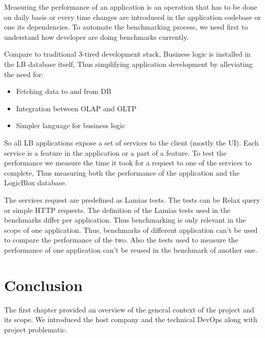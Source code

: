 Measuring the performance of an application is an operation that has to be done on
daily basis or every time changes are introduced in the application codebase or
one its dependencies.
To automate the benchmarking process, we need first to understand how developer
are doing benchmarks currently.

Compare to traditional 3-tired development stack, Business logic is installed in
the LB database itself, Thus simplifying  application development by alleviating
the need for:
\begin{itemize}
\item{Fetching data to and from DB }
\item{Integration between OLAP and OLTP}
\item{Simpler language for business logic}
\end{itemize}

So all LB applications expose a set of services to the client (mostly the UI).
Each service is a feature in the application or a part of a feature. To test the
performance we measure the time it took for a request to one of the services to
complete, Thus measuring both the performance of the application and the
LogicBlox database.

The services request are predefined as Lamias tests. The tests can be Relax
query or simple HTTP requests. The definition of the Lamias tests used in the
benchmarks differ per application. Thus benchmarking is only relevant in the
scope of one application. Thus, benchmarks of different application can't be
used to compare the performance of the two. Also the tests used to measure the
performance of one application can't be reused in the benchmark of another one.

\section*{Conclusion}
The first chapter provided an overview of the general context of the project and
its scope. We introduced the host company and the technical DevOps along with
project problematic.
